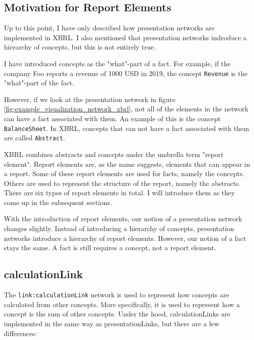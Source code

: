 \subsection{Motivation for Report Elements}
\label{sec:report_elements_motivation}

Up to this point, I have only described how presentation networks are implemented in XBRL.
I also mentioned that presentation networks indroduce a hierarchy of concepts, but this is not entirely true.

I have introduced concepts as the "what"-part of a fact. 
For example, if the company Foo reports a revenue of 1000 USD in 2019, the concept \texttt{Revenue} is the "what"-part of the fact.

However, if we look at the presentation network in figure \ref{fig:example_visualization_network_xbrl}, not all of the elements in the network can have a fact associated with them.
An example of this is the concept \texttt{BalanceSheet}.
In XBRL, concepts that can not have a fact associated with them are called \texttt{Abstract}.

XBRL combines abstracts and concepts under the umbrella term "report element".
Report elements are, as the name suggests, elements that can appear in a report.
Some of these report elements are used for facts, namely the concepts.
Others are used to represent the structure of the report, namely the abstracts.
There are six types of report elements in total\cite{oim}. 
I will introduce them as they come up in the subsequent sections.

With the introduction of report elements, our notion of a presentation network changes slightly.
Instead of introducing a hierarchy of concepts, presentation networks introduce a hierarchy of report elements.
However, our notion of a fact stays the same.
A fact is still requires a concept, not a report element.

\subsection{calculationLink}
\label{sec:calculationLink}

The \texttt{link:calculationLink} network is used to represent how concepts are calculated from other concepts.
More specifically, it is used to represent how a concept is the sum of other concepts.
Under the hood, calculationLinks are implemented in the same way as presentationLinks, but there are a few differences:

